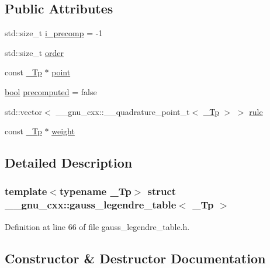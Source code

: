 \subsection*{Public Attributes}
\begin{DoxyCompactItemize}
\item 
std\+::size\+\_\+t \hyperlink{struct____gnu__cxx_1_1gauss__legendre__table_a6f86bbb7d5ed663b88683156a38f4a05}{i\+\_\+precomp} = -\/1
\item 
std\+::size\+\_\+t \hyperlink{struct____gnu__cxx_1_1gauss__legendre__table_aecdc9cdb90f5a7b4f06a455cd868370f}{order}
\item 
const \hyperlink{namespace____gnu__cxx_a3b19a9c800ca194374ef9172290f7d79}{\+\_\+\+Tp} $\ast$ \hyperlink{struct____gnu__cxx_1_1gauss__legendre__table_a2b2ec503ecb0fa74ccdba5b81e4edcd0}{point}
\item 
\hyperlink{namespace____gnu__cxx_ae83aca57f97767d5d09188718728a0ac}{bool} \hyperlink{struct____gnu__cxx_1_1gauss__legendre__table_acbcd2eeb79842a232207882c5a4d01c0}{precomputed} = false
\item 
std\+::vector$<$ \+\_\+\+\_\+gnu\+\_\+cxx\+::\+\_\+\+\_\+quadrature\+\_\+point\+\_\+t$<$ \hyperlink{namespace____gnu__cxx_a3b19a9c800ca194374ef9172290f7d79}{\+\_\+\+Tp} $>$ $>$ \hyperlink{struct____gnu__cxx_1_1gauss__legendre__table_a1c1f6c907f2bcee143c39136679901b4}{rule}
\item 
const \hyperlink{namespace____gnu__cxx_a3b19a9c800ca194374ef9172290f7d79}{\+\_\+\+Tp} $\ast$ \hyperlink{struct____gnu__cxx_1_1gauss__legendre__table_a4bc3bb73288637899d2eb459eb751607}{weight}
\end{DoxyCompactItemize}


\subsection{Detailed Description}
\subsubsection*{template$<$typename \+\_\+\+Tp$>$\newline
struct \+\_\+\+\_\+gnu\+\_\+cxx\+::gauss\+\_\+legendre\+\_\+table$<$ \+\_\+\+Tp $>$}



Definition at line 66 of file gauss\+\_\+legendre\+\_\+table.\+h.



\subsection{Constructor \& Destructor Documentation}
\mbox{\label{struct____gnu__cxx_1_1gauss__legendre__table_a8984aa2f4c44ecdcee67ee91043f002b}} 
